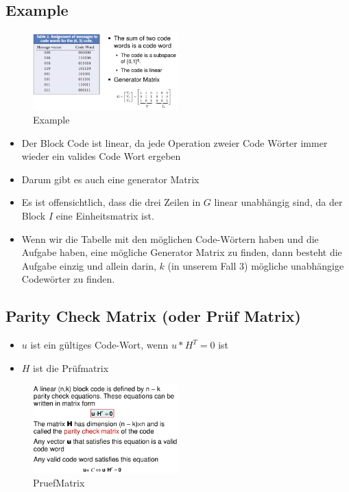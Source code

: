\hypertarget{example}{%
\subsection{Example}\label{example}}

\begin{figure}[H]
\centering
\includegraphics[width=0.5\textwidth]{figures/63blockCode.png}
\caption{Example}
\end{figure}

\begin{itemize}
\tightlist
\item
  Der Block Code ist linear, da jede Operation zweier Code Wörter immer
  wieder ein valides Code Wort ergeben
\item
  Darum gibt es auch eine generator Matrix
\item
  Es ist offensichtlich, dass die drei Zeilen in $G$ linear unabhängig
  sind, da der Block $I$ eine Einheitsmatrix ist.
\item
  Wenn wir die Tabelle mit den möglichen Code-Wörtern haben und die
  Aufgabe haben, eine mögliche Generator Matrix zu finden, dann besteht
  die Aufgabe einzig und allein darin, $k$ (in unserem Fall 3) mögliche
  unabhängige Codewörter zu finden.
\end{itemize}

\hypertarget{parity-check-matrix-oder-pruxfcf-matrix}{%
\subsection{Parity Check Matrix (oder Prüf
Matrix)}\label{parity-check-matrix-oder-pruxfcf-matrix}}

\begin{itemize}
\tightlist
\item
  $u$ ist ein gültiges Code-Wort, wenn $u * H^T = 0$ ist
\item
  $H$ ist die Prüfmatrix
\end{itemize}

\begin{figure}[H]
\centering
\includegraphics[width=0.5\textwidth]{figures/pruefmatrix.png}
\caption{PruefMatrix}
\end{figure}

